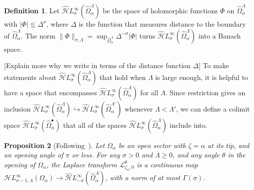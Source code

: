 \documentclass{article}
\newcommand{\singexp}[2]{\mathcal{H}L^\infty_{#1, #2}}
\newcommand{\dualsingexp}[1]{\widehat{\mathcal{H}}L^\infty_{#1}}
\newcommand{\laplace}{\mathcal{L}}
\theoremstyle{definition}
\newtheorem{definition}{Definition}[section]
\theoremstyle{plain}
\newtheorem{prop}[definition]{Proposition}
\newenvironment{todo}{\color{Coral}}{\color{black}}
\newenvironment{revised}{\color{DarkBlue}}{\color{black}}
\newenvironment{revised}{}{}
\begin{document}
\begin{revised}
\begin{definition}\label{def:H_hat}
Let $\dualsingexp{\sigma}(\widehat{\Omega}_\alpha^\Lambda)$ be the space of holomorphic functions $\Phi$ on $\widehat{\Omega}_\alpha^\Lambda$ with $|\Phi| \lesssim \Delta^\sigma$, where $\Delta$ is the function that measures distance to the boundary of $\widehat{\Omega}_\alpha^\Lambda$. The norm $\|\Phi\|_{\sigma, \Lambda} = \sup_{\widehat{\Omega}_\alpha^\Lambda} \Delta^{-\sigma} |\Phi|$ turns $\dualsingexp{\sigma}(\widehat{\Omega}_\alpha^\Lambda)$ into a Banach space.    
\end{definition}    
\end{revised}
\begin{todo}[Explain more why we write in terms of the distance function $\Delta$]\end{todo}
\begin{revised}
To make statements about $\dualsingexp{\sigma}(\widehat{\Omega}_\alpha^\Lambda)$ that hold when $\Lambda$ is large enough, it is helpful to have a space that encompasses $\dualsingexp{\sigma}(\widehat{\Omega}_\alpha^\Lambda)$ for all $\Lambda$. Since restriction gives an inclusion $\dualsingexp{\sigma}(\widehat{\Omega}_\alpha^\Lambda) \hookrightarrow \dualsingexp{\sigma}(\widehat{\Omega}_\alpha^{\Lambda'})$ whenever $\Lambda < \Lambda'$, we can define a colimit space $\dualsingexp{\sigma}(\widehat{\Omega}_\alpha^\bullet)$ that all of the spaces $\dualsingexp{\sigma}(\widehat{\Omega}_\alpha^\Lambda)$ include into.  
\end{revised}
\begin{todo}\par
[Note that these results don't depend on which cotangent fiber we're mapping into. $\widehat{\Omega}$ is defined across all cotangent fibers over ordinary points.]
\end{todo}
%
\begin{prop}[Following~\cite{sternin1995borel}]\label{prop:laplace-cont}
Let $\Omega_\alpha$ be an open sector with $\zeta = \alpha$ at its tip, and an opening angle of $\pi$ or less. For any $\sigma > 0$ and $\Lambda \ge 0$, and any angle $\theta$ in the opening of $\Omega_\alpha$, the Laplace transform $\laplace_{\zeta_\alpha, 0}^\theta$ is a continuous map $\singexp{\sigma-1}{\Lambda}(\Omega_\alpha) \to \dualsingexp{-\sigma}(\widehat{\Omega}_\alpha^\Lambda)$, with a norm of at most $\Gamma(\sigma)$.
\end{prop}
\end{document}
